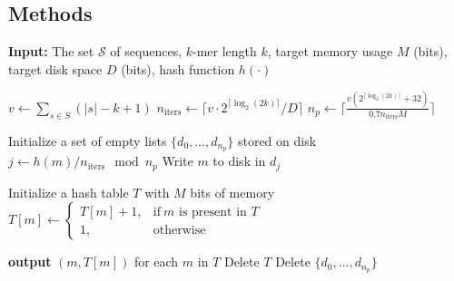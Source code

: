 \documentclass{bioinfo}
\newcommand{\dsk}{DSK\xspace}
\begin{document}
\begin{methods}
\section{Methods}
\begin{algorithm}[t]
	\begin{algorithmic}[1]
	 \STATE \textbf{Input:}  The set $\mathcal{S}$ of sequences, $k$-mer length $k$, target memory usage $M$ (bits), target disk space $D$ (bits), hash function $h(\cdot)$
     
     \STATE $v \leftarrow \sum_{s\in S} \left( |s|-k+1\right)$ \hfill{}
     \STATE $n_\textrm{iters} \leftarrow \lceil v \cdot 2^{\lceil \log_2(2k)\rceil} / D \rceil$ \hfill{}
     \STATE $n_p \leftarrow \displaystyle \lceil \frac{v(2^{\lceil \log_2(2k)\rceil}+32)}{0.7 n_\textrm{iters} M}\rceil$ \hfill{}


       \STATE Initialize a set of empty lists $\{d_0,...,d_{n_p}\}$ stored on disk
        \label{start-reads-for}
            \STATE $j \leftarrow h(m)/n_\textrm{iters} \mod n_p$ 
            \STATE Write $m$ to disk in $d_j$
          \ENDIF
        \ENDFOR
       \ENDFOR \label{end-reads-for}


      \label{start-hashing-for}
        \STATE Initialize a hash table $T$ with $M$ bits of memory
            \STATE $T[m] \leftarrow \begin{cases} T[m]+1, & \text{if}\ \text{$m$ is present in $T$} \\ 1, & \text{otherwise} \end{cases}$\label{hash-insert-access}

        \ENDFOR
        \STATE \textbf{output} $(m, T[m])$ for each $m$ in $T$
        \STATE Delete $T$
     \ENDFOR \label{end-hashing-for}
     \STATE Delete $\{d_0,...,d_{n_p}\}$
     \ENDFOR 
    \end{algorithmic}
    \caption{The \dsk algorithm\label{alg:dsk}}
\end{algorithm}




\end{methods}
\end{document}
